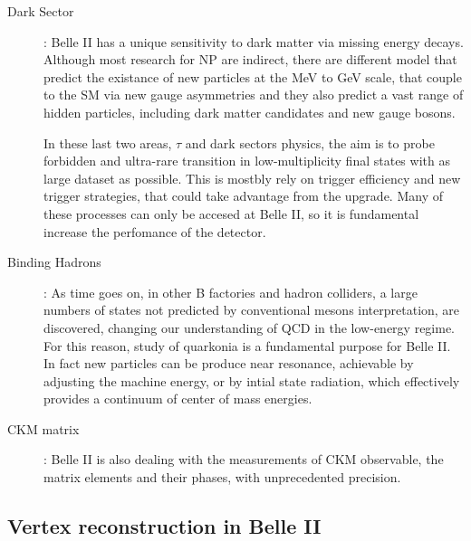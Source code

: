 \begin{description}
\item[Dark Sector]: Belle II has a unique sensitivity to dark matter via missing energy decays. Although most research for NP are indirect, there are different model that predict the existance of new particles at the MeV to GeV scale, that couple to the SM via new gauge asymmetries and they also predict a vast range of hidden particles, including dark matter candidates and new gauge bosons.

In these last two areas, $\tau$ and dark sectors physics, the aim is to probe forbidden and ultra-rare transition in low-multiplicity final states with as large dataset as possible. This is mostbly rely on trigger efficiency and new trigger strategies, that could take advantage from the upgrade. Many of these processes can only be accesed at Belle II, so it is fundamental increase the perfomance of the detector.

\item[Binding Hadrons]: As time goes on, in other B factories and hadron colliders, a large numbers of states not predicted by conventional mesons interpretation, are discovered, changing our understanding of QCD in the low-energy regime. For this reason, study of quarkonia is a fundamental purpose for Belle II. In fact new particles can be produce near resonance, achievable by adjusting the machine energy, or by intial state radiation, which effectively provides a continuum of center of mass energies. 

\item[CKM matrix]: Belle II is also dealing with the measurements of CKM observable, the matrix elements and their phases, with unprecedented precision. 

\end{description}


\subsection{Vertex reconstruction in Belle II}



\newpage























